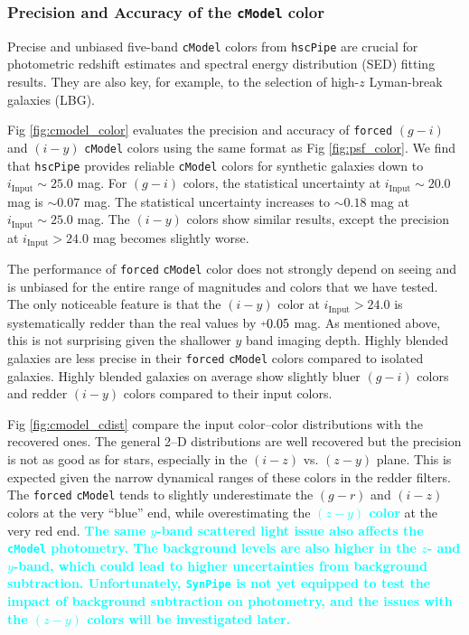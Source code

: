 \documentclass[useamsfonts]{pasj01}
\def\hscpipe{\texttt{hscPipe}}
\def\synpipe{\texttt{SynPipe}}
\def\cmodel{\texttt{cModel}}
\def\forced{\texttt{forced}}
\newcommand{\song}[1]{\textcolor{cyan} {\textbf{#1}}}
\newcommand{\plus}{\raisebox{.4\height}{\scalebox{.6}{+}}}
\begin{document}
\subsubsection{Precision and Accuracy of the \cmodel{} color}

    Precise and unbiased five-band \cmodel{} colors from \hscpipe{} are crucial for
    photometric redshift estimates and spectral energy distribution (SED) fitting 
    results. 
    They are also key, for example, to the selection of high-$z$ Lyman-break 
    galaxies (LBG).

    Fig \ref{fig:cmodel_color} evaluates the precision and accuracy of \forced{} 
    $(g-i)$ and $(i-y)$ \cmodel{} colors using the same format as 
    Fig \ref{fig:psf_color}. 
    We find that \hscpipe{} provides reliable \cmodel{} colors for synthetic 
    galaxies down to $i_{\mathrm{Input}}{\sim}25.0$ mag.
    For $(g-i)$ colors, the statistical uncertainty at $i_{\mathrm{Input}}{\sim}20.0$ 
    mag is ${\sim}0.07$ mag.
    The statistical uncertainty increases to ${\sim}0.18$ mag at 
    $i_{\mathrm{Input}}{\sim}25.0$ mag.
    The $(i-y)$ colors show similar results, except the precision at 
    $i_{\mathrm{Input}}>24.0$ mag becomes slightly worse.

    The performance of \forced{} \cmodel{} color does not strongly depend on seeing 
    and is unbiased for the entire range of magnitudes and colors that we have tested.
    The only noticeable feature is that the $(i-y)$ color at $i_{\mathrm{Input}}>24.0$ 
    is systematically redder than the real values by $\plus0.05$ mag.
    As mentioned above, this is not surprising given the shallower $y$ band 
    imaging depth. 
    Highly blended galaxies are less precise in their \forced{} \cmodel{} colors 
    compared to isolated galaxies.  
    Highly blended galaxies on average show slightly bluer $(g-i)$ colors and redder  
    $(i-y)$ colors compared to their input colors.

    Fig \ref{fig:cmodel_cdist} compare the input color--color distributions with the
    recovered ones. 
    The general 2--D distributions are well recovered but the precision is not as 
    good as for stars, especially in the $(i-z)$ vs. $(z-y)$ plane.
    This is expected given the narrow dynamical ranges of these colors in the redder 
    filters.
    The \forced{} \cmodel{} tends to slightly underestimate the $(g-r)$ and $(i-z)$
    colors at the very ``blue'' end, while overestimating the \song{
    $(z-y)$ color}
    at the very red end.
    \song{
    The same $y$-band scattered light issue also affects the \cmodel{} photometry. 
    The background levels are also higher in the $z$- and $y$-band, which could lead 
    to higher uncertainties from background subtraction.  
    Unfortunately, \synpipe{} is not yet equipped to test the impact of background 
    subtraction on photometry, and the issues with the $(z-y)$ colors will be 
    investigated later. 
    }
\end{document}
